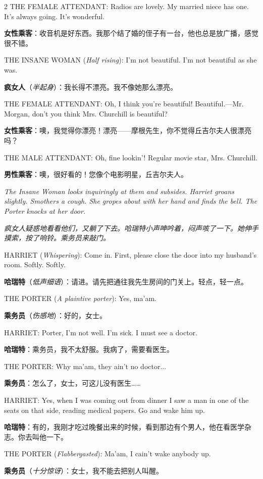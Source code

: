 \documentclass[lang=cn,newtx,10pt,scheme=chinese]{elegantbook}
\newcommand{\pair}[2]{%
\switchcolumn* #2\par
\switchcolumn  #1\par
}
\begin{document}
\begin{paracol}{2}
\pair{
    \textbf{女性乘客}：收音机是好东西。我那个结了婚的侄子有一台，他也总是放广播，感觉很不错。
}{
    THE FEMALE ATTENDANT: Radios are lovely. My married niece has one. It's always going. It's wonderful.
}

\pair{
    \textbf{疯女人}（\textit{半起身}）：我长得不漂亮。我不像她那么漂亮。
}{
    THE INSANE WOMAN (\textit{Half rising}): I'm not beautiful. I'm not beautiful as she was.
}

\pair{
    \textbf{女性乘客}：噢，我觉得你漂亮！漂亮——摩根先生，你不觉得丘吉尔夫人很漂亮吗？
}{
    THE FEMALE ATTENDANT: Oh, I think you're beautiful! Beautiful.—Mr. Morgan, don't you think Mrs. Churchill is beautiful?
}

\pair{
    \textbf{男性乘客}：噢，很好看的！您像个电影明星，丘吉尔夫人。
}{
    THE MALE ATTENDANT: Oh, fine lookin'! Regular movie star, Mrs. Churchill.
    \newline
    \newline
}

\pair{
    \textit{疯女人疑惑地看看他们，又躺了下去。哈瑞特小声呻吟着，闷声咳了一下。她伸手摸索，按了响铃。乘务员来敲门。}
}{
    \textit{The Insane Woman looks inquiringly at them and subsides. Harriet groans slightly. Smothers a cough. She gropes about with her hand and finds the bell. The Porter knocks at her door.}
    \newline
    \newline
}

\pair{
    \textbf{哈瑞特}（\textit{低声细语}）：请进。请先把通往我先生房间的门关上。轻点，轻一点。
}{
    HARRIET (\textit{Whispering}): Come in. First, please close the door into my husband’s room. Softly. Softly.
}

\pair{
    \textbf{乘务员}（\textit{伤感地}）：好的，女士。
}{
    THE PORTER (\textit{A plaintive porter}): Yes, ma'am.
}

\pair{
    \textbf{哈瑞特}：乘务员，我不太舒服。我病了，需要看医生。
}{
    HARRIET: Porter, I'm not well. I'm sick. I must see a doctor.
}

\pair{
    \textbf{乘务员}：怎么了，女士，可这儿没有医生……
}{
    THE PORTER: Why ma'am, they ain't no doctor...
}

\pair{
    \textbf{哈瑞特}：有的，我刚才吃过晚餐出来的时候，看到那边有个男人，他在看医学杂志。你去叫他一下。
}{
    HARRIET: Yes, when I was coming out from dinner I saw a man in one of the seats on that side, reading medical papers. Go and wake him up.
}

\pair{
    \textbf{乘务员}（\textit{十分惊讶}）：女士，我不能去把别人叫醒。
}{
    THE PORTER (\textit{Flabbergasted}): Ma'am, I cain't wake anybody up.
}


\end{paracol}
\end{document}
